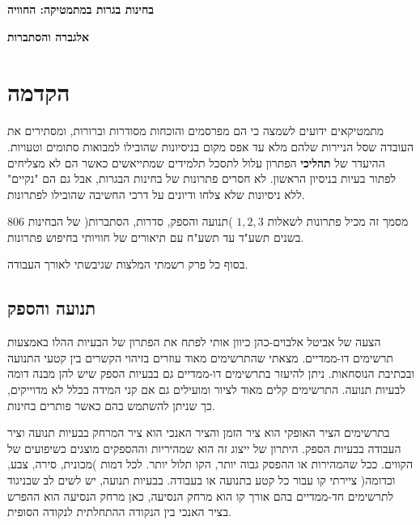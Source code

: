 

\thispagestyle{empty}

\begin{center}
\textbf{\LARGE בחינות בגרות במתמטיקה: החוויה}

\bigskip
\bigskip

\textbf{\LARGE אלגברה והסתברות}
\end{center}



\section*{הקדמה}

מתמטיקאים ידועים לשמצה כי הם מפרסמים והוכחות מסודרות וברורות, ומסתירים את העובדה שסל הניירות שלהם מלא עד אפס מקום בניסיונות שהובילו למבואות סתומים וטעויות. ההיעדר של 
\textbf{תהליכי}
הפתרון עלול לתסכל תלמידים שמתייאשים כאשר הם לא מצליחים לפתור בעיות בניסיון הראשון. לא חסרים פתרונות של בחינות הבגרות, אבל גם הם "נקיים" ללא ניסיונות שלא צלחו ודיונים על דרכי החשיבה שהובילו לפתרונות.

מסמך זה מכיל פתרונות לשאלות  
$1,2,3$
)תנועה והספק, סדרות, הסתברות( של הבחינות 
$806$
בשנים תשע"ד עד תשע"ח עם תיאורים של חוויותי בחיפוש פתרונות.

בסוף כל פרק רשמתי המלצות שגיבשתי לאורך העבודה.
\subsection*{תנועה והספק}

הצעה של אביטל אלבוים-כהן כיוון אותי לפתח את הפתרון של הבעיות ההלו באמצעות תרשימים דו-ממדיים. מצאתי שהתרשימים מאוד עוזרים בזיהוי הקשרים בין קטעי התנועה ובכתיבת הנוסחאות. ניתן להיעזר בתרשימים דו-ממדיים גם בבעיות הספק שיש להן מבנה דומה לבעיות תנועה. התרשימים קלים מאוד לציור ומועילים גם אם קני המידה בכלל לא מדוייקים, כך שניתן להשתמש בהם כאשר פותרים בחינות.


בתרשימים הציר האופקי הוא ציר הזמן והציר האנכי הוא ציר המרחק בבעיות תנועה וציר העבודה בבעיות הספק. היתרון של ייצוג זה הוא שמהיריות וההספקים מוצגים כשיפועים של הקווים. ככל שהמהירות או ההפסק גבוה יותר, הקו תלול יותר. לכל דמות )מכונית, סירה, צבע, וכדומה( ציירתי קו עבור כל קטע בתנועה או בעבודה. בבעיות תנועה, יש לשים לב שבניגוד לתרשימים חד-ממדיים בהם אורך קו הוא מרחק הנסיעה, כאן מרחק הנסיעה הוא ההפרש בציר האנכי בין הנקודה ההתחלתית לנקודה הסופית.

